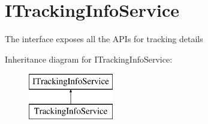 \hypertarget{interfaceWildLifeTracker_1_1Services_1_1ITrackingInfoService}{}\section{I\+Tracking\+Info\+Service}
\label{interfaceWildLifeTracker_1_1Services_1_1ITrackingInfoService}


The interface exposes all the A\+P\+Is for tracking details  


Inheritance diagram for I\+Tracking\+Info\+Service\+:\begin{figure}[H]
\begin{center}
\leavevmode
\includegraphics[height=2.000000cm]{interfaceWildLifeTracker_1_1Services_1_1ITrackingInfoService}
\end{center}
\end{figure}
